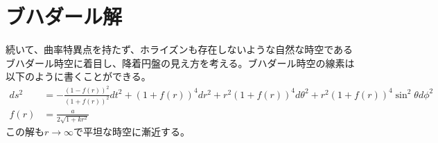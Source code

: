 \documentclass[dvipdfmx]{report} %
\begin{document}
\chapter{ブハダール解}
続いて、曲率特異点を持たず、ホライズンも存在しないような自然な時空であるブハダール時空に着目し、降着円盤の見え方を考える。ブハダール時空の線素は以下のように書くことができる。
\begin{equation*}
\begin{split}
	ds^2 &=
		- \frac{(1 - f(r))^2}{(1 + f(r))^2} dt^2
		+ (1 + f(r))^4 dr^2
		+ r^2(1 + f(r))^4 d\theta^2
		+ r^2 (1 + f(r))^4 \sin ^2 \theta d\phi^2 \\
	f(r) &= \frac{a}{2\sqrt{1 + k r^2}} 
\end{split}
\end{equation*}
この解も$r \rightarrow \infty$で平坦な時空に漸近する。

\end{document}
